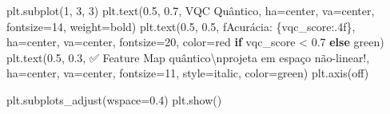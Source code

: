 \documentclass[
  brazilian,
]{report}
\newenvironment{Shaded}{\begin{snugshade}}{\end{snugshade}}
\newcommand{\CharTok}[1]{\textcolor[rgb]{0.13,0.47,0.30}{#1}}
\newcommand{\ControlFlowTok}[1]{\textcolor[rgb]{0.00,0.23,0.31}{\textbf{#1}}}
\newcommand{\DecValTok}[1]{\textcolor[rgb]{0.68,0.00,0.00}{#1}}
\newcommand{\FloatTok}[1]{\textcolor[rgb]{0.68,0.00,0.00}{#1}}
\newcommand{\NormalTok}[1]{\textcolor[rgb]{0.00,0.23,0.31}{#1}}
\newcommand{\OperatorTok}[1]{\textcolor[rgb]{0.37,0.37,0.37}{#1}}
\newcommand{\SpecialCharTok}[1]{\textcolor[rgb]{0.37,0.37,0.37}{#1}}
\newcommand{\SpecialStringTok}[1]{\textcolor[rgb]{0.13,0.47,0.30}{#1}}
\newcommand{\StringTok}[1]{\textcolor[rgb]{0.13,0.47,0.30}{#1}}
\begin{document}
\begin{tcolorbox}
\begin{Shaded}
\begin{Highlighting}[]
\NormalTok{plt.subplot(}\DecValTok{1}\NormalTok{, }\DecValTok{3}\NormalTok{, }\DecValTok{3}\NormalTok{)}
\NormalTok{plt.text(}\FloatTok{0.5}\NormalTok{, }\FloatTok{0.7}\NormalTok{, }\StringTok{\textquotesingle{}VQC Quântico\textquotesingle{}}\NormalTok{, ha}\OperatorTok{=}\StringTok{\textquotesingle{}center\textquotesingle{}}\NormalTok{, va}\OperatorTok{=}\StringTok{\textquotesingle{}center\textquotesingle{}}\NormalTok{, }
\NormalTok{         fontsize}\OperatorTok{=}\DecValTok{14}\NormalTok{, weight}\OperatorTok{=}\StringTok{\textquotesingle{}bold\textquotesingle{}}\NormalTok{)}
\NormalTok{plt.text(}\FloatTok{0.5}\NormalTok{, }\FloatTok{0.5}\NormalTok{, }\SpecialStringTok{f\textquotesingle{}Acurácia: }\SpecialCharTok{\{}\NormalTok{vqc\_score}\SpecialCharTok{:.4f\}}\SpecialStringTok{\textquotesingle{}}\NormalTok{, ha}\OperatorTok{=}\StringTok{\textquotesingle{}center\textquotesingle{}}\NormalTok{, va}\OperatorTok{=}\StringTok{\textquotesingle{}center\textquotesingle{}}\NormalTok{, }
\NormalTok{         fontsize}\OperatorTok{=}\DecValTok{20}\NormalTok{, color}\OperatorTok{=}\StringTok{\textquotesingle{}red\textquotesingle{}} \ControlFlowTok{if}\NormalTok{ vqc\_score }\OperatorTok{\textless{}} \FloatTok{0.7} \ControlFlowTok{else} \StringTok{\textquotesingle{}green\textquotesingle{}}\NormalTok{)}
\NormalTok{plt.text(}\FloatTok{0.5}\NormalTok{, }\FloatTok{0.3}\NormalTok{, }\StringTok{\textquotesingle{}✅ Feature Map quântico}\CharTok{\textbackslash{}n}\StringTok{projeta em espaço não{-}linear!\textquotesingle{}}\NormalTok{, }
\NormalTok{         ha}\OperatorTok{=}\StringTok{\textquotesingle{}center\textquotesingle{}}\NormalTok{, va}\OperatorTok{=}\StringTok{\textquotesingle{}center\textquotesingle{}}\NormalTok{, fontsize}\OperatorTok{=}\DecValTok{11}\NormalTok{, style}\OperatorTok{=}\StringTok{\textquotesingle{}italic\textquotesingle{}}\NormalTok{, color}\OperatorTok{=}\StringTok{\textquotesingle{}green\textquotesingle{}}\NormalTok{)}
\NormalTok{plt.axis(}\StringTok{\textquotesingle{}off\textquotesingle{}}\NormalTok{)}

\NormalTok{plt.subplots\_adjust(wspace}\OperatorTok{=}\FloatTok{0.4}\NormalTok{)}
\NormalTok{plt.show()}


\end{Highlighting}
\end{Shaded}
\end{tcolorbox}
\end{document}
